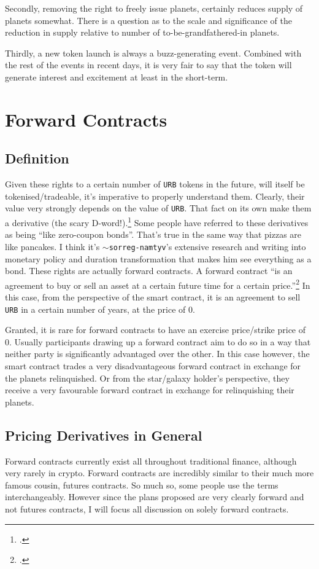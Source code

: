 \documentclass{article}
\begin{document}
	Secondly, removing the right to freely issue planets, certainly reduces supply of planets somewhat. There is a question as to the scale and significance of the reduction in supply relative to number of to-be-grandfathered-in planets.
	
	Thirdly, a new token launch is always a buzz-generating event. Combined with the rest of the events in recent days, it is very fair to say that the token will generate interest and excitement at least in the short-term.
	
	\section{Forward Contracts}
	\subsection{Definition}
	Given these rights to a certain number of \texttt{URB} tokens in the future, will itself be tokenised/tradeable, it's imperative to properly understand them. Clearly, their value very strongly depends on the value of \texttt{URB}. That fact on its own make them a derivative (the scary D-word!).\footcite[23]{hull} Some people have referred to these derivatives as being ``like zero-coupon bonds''. That's true in the same way that pizzas are like pancakes. I think it's \texttt{$\sim$sorreg-namtyv}'s extensive research and writing into monetary policy and duration transformation that makes him see everything as a bond. These rights are actually forward contracts. A forward contract ``is an agreement to buy or sell an asset at a certain future time for a certain price.''\footcite[28]{hull} In this case, from the perspective of the smart contract, it is an agreement to sell \texttt{URB} in a certain number of years, at the price of 0.
	
	Granted, it is rare for forward contracts to have an exercise price/strike price of 0. Usually participants drawing up a forward contract aim to do so in a way that neither party is significantly advantaged over the other. In this case however, the smart contract trades a very disadvantageous forward contract in exchange for the planets relinquished. Or from the star/galaxy holder's perspective, they receive a very favourable forward contract in exchange for relinquishing their planets.

	\subsection{Pricing Derivatives in General}
	Forward contracts currently exist all throughout traditional finance, although very rarely in crypto. Forward contracts are incredibly similar to their much more famous cousin, futures contracts. So much so, some people use the terms interchangeably. However since the plans proposed are very clearly forward and not futures contracts, I will focus all discussion on solely forward contracts.
	
\end{document}
